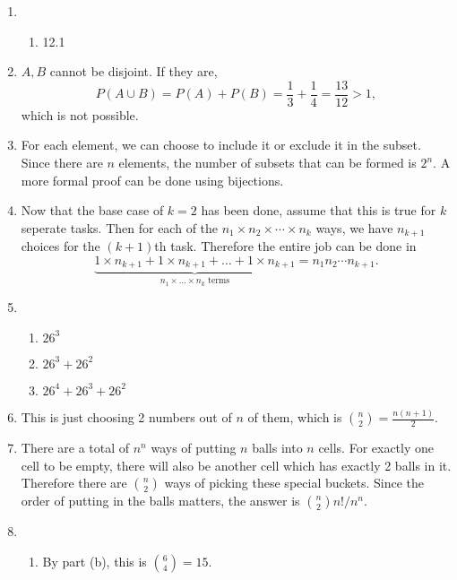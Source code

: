 \documentclass{article}
\begin{document}
\begin{enumerate}
    \item \begin{enumerate}
        \item 12.1
    \end{enumerate}

    \item $A, B$ cannot be disjoint. If they are, \[
        P(A \cup B) = P(A) + P(B) = \frac{1}{3} + \frac{1}{4} = \frac{13}{12} > 1,
    \]
    which is not possible.

    \item For each element, we can choose to include it or exclude it in the subset. Since there 
    are $n$ elements, the number of subsets that can be formed is $2^{n}$. A more formal proof 
    can be done using bijections.

    \item Now that the base case of $k = 2$ has been done, assume that this is true for $k$ 
    seperate tasks. Then for each of the $n_1 \times n_2 \times \cdots \times n_k$ ways, we 
    have $n_{k + 1}$ choices for the $(k + 1)$th task. Therefore the entire job can be done in 
    \[ \underbrace{1 \times n_{k + 1} + 1 \times n_{k + 1} + \dots + 1 \times n_{k + 1}}
    _{n_1 \times ... \times n_k \text{ terms}} = n_1 n_2 \cdots n_{k + 1}. \]

    \item \begin{enumerate}
        \item $26^3$
        \item $26^3 + 26^2$
        \item $26^4 + 26^3 + 26^2$
    \end{enumerate}

    \item This is just choosing 2 numbers out of $n$ of them, which is $\binom{n}{2} 
    = \frac{n(n + 1)}{2}$.

    \item There are a total of $n^n$ ways of putting $n$ balls into $n$ cells. For exactly one 
    cell to be empty, there will also be another cell which has exactly 2 balls in it. Therefore 
    there are $\binom{n}{2}$ ways of picking these special buckets. Since the order of putting 
    in the balls matters, the answer is $\binom{n}{2}n! / n^n$.

    \item \begin{enumerate}
        \item By part (b), this is $\binom{6}{4} = 15$.


\end{enumerate}
\end{enumerate}
\end{document}
